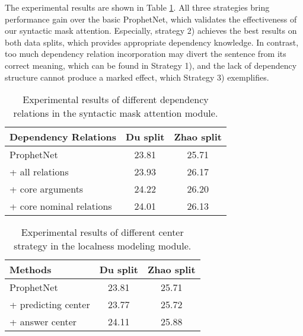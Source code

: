 \documentclass[11pt]{article}
\begin{document}
The experimental results are shown in Table \ref{depen-select-table}. All three strategies bring performance gain over the basic ProphetNet, which validates the effectiveness of our syntactic mask attention. Especially, strategy 2) achieves the best results on both data splits, which provides appropriate dependency knowledge. In contrast, too much dependency relation incorporation may divert the sentence from its correct meaning, which can be found in Strategy 1), and the lack of dependency structure cannot produce a marked effect, which Strategy 3) exemplifies.
\begin{table}[t]
\centering
\small
\begin{tabular}{@{}l|c|c@{}}
\toprule[1pt]
\textbf{Dependency Relations} & \multicolumn{1}{c|}{\textbf{Du split}} & \textbf{Zhao split} \\ \midrule
ProphetNet                    & 23.81                         &   25.71         \\
+ all relations               & 23.93                         &   26.17       \\
+ core arguments              & 24.22                         &   26.20           \\
+ core nominal relations      & 24.01                         &   26.13    \\ \bottomrule[1pt]
\end{tabular}
\caption{Experimental results of different dependency relations in the syntactic mask attention module. }
\label{depen-select-table}
\end{table}
\begin{table}[t]
\centering
\small
\begin{tabular}{@{}l|c|c@{}}
\toprule[1pt]
\textbf{Methods}             & \textbf{Du split} & \textbf{Zhao split}\\ \midrule
ProphetNet          &   23.81   &   25.71  \\
+ predicting center &   23.77   &   25.72  \\
+ answer center     &   24.11   &   25.88  \\ \bottomrule[1pt]
\end{tabular}
\caption{Experimental results of different center strategy in the localness modeling module.}
\label{predict-center-tabel}
\end{table}
\end{document}
